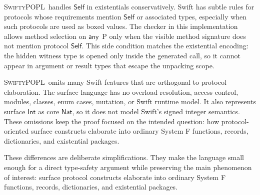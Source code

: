 \documentclass[manuscript,nonacm]{acmart}
\newcommand{\lang}{\textsc{SwiftyPOPL}}
\newcommand{\kw}[1]{\ensuremath{\mathsf{#1}}}
\newcommand{\Int}{\kw{Int}}
\newcommand{\Nat}{\kw{Nat}}
\newcommand{\Self}{\kw{Self}\xspace}
\newcommand{\Any}[1]{\kw{any}\ #1}
\begin{document}
\lang\ handles \Self in existentials conservatively.
Swift has subtle rules for protocols whose requirements mention \Self or associated types, especially when such protocols are used as boxed values.
The checker in this implementation allows method selection on \Any{P} only when the visible method signature does not mention protocol \Self.
This side condition matches the existential encoding:
the hidden witness type is opened only inside the generated call, so it cannot appear in argument or result types that escape the unpacking scope.

\lang\ omits many Swift features that are orthogonal to protocol elaboration.
The surface language has no overload resolution, access control, modules, classes, enum cases, mutation, or Swift runtime model.
It also represents surface \Int{} as core \Nat, so it does not model Swift's signed integer semantics.
These omissions keep the proof focused on the intended question:
how protocol-oriented surface constructs elaborate into ordinary System F functions, records, dictionaries, and existential packages.

These differences are deliberate simplifications.
They make the language small enough for a direct type-safety argument while preserving the main phenomenon of interest:
surface protocol constructs elaborate into ordinary System F functions, records, dictionaries, and existential packages.
\end{document}
